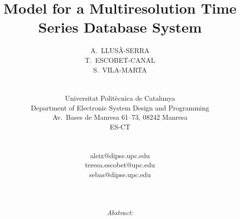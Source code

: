 \documentclass[twocolumn,11pt,a4paper]{article}
\begin{document}
\global\def\refname{{\normalsize \it References:}}
%
\baselineskip 12.5pt
%
%
%
\title{\LARGE \bf Model for a Multiresolution Time Series
  Database System}

\date{}

\author{\hspace*{-10pt}
\begin{minipage}[t]{2.3in} \normalsize \baselineskip 12.5pt
\centerline{\scshape A.~LLUSÀ-SERRA}
\end{minipage} \kern 0in
\begin{minipage}[t]{2.3in} \normalsize \baselineskip 12.5pt
\centerline{\scshape T.~ESCOBET-CANAL}
\end{minipage} \kern 0in
\begin{minipage}[t]{2.3in} \normalsize \baselineskip 12.5pt
\centerline{\scshape S.~VILA-MARTA}
\end{minipage} \\ \hspace*{-10pt}
%
\begin{minipage}[t]{2.7in} \normalsize \baselineskip 12.5pt
\centerline{Universitat Politècnica de Catalunya}
\centerline{Department of Electronic System Design and Programming}
\centerline{Av.~Bases de Manresa 61--73, 08242 Manresa}
\centerline{\scshape ES-CT}
\end{minipage} \\ \hspace*{-5pt}
%
\begin{minipage}[t]{2.3in} \normalsize \baselineskip 12.5pt
\centerline{aleix@dipse.upc.edu}
\end{minipage} \kern 0in
\begin{minipage}[t]{2.3in} \normalsize \baselineskip 12.5pt
\centerline{teresa.escobet@upc.edu}
\end{minipage} \kern 0in
\begin{minipage}[t]{2.3in} \normalsize \baselineskip 12.5pt
\centerline{sebas@dipse.upc.edu}
\end{minipage} 
%
\\ \\ \hspace*{-10pt}
\begin{minipage}[b]{6.9in} \normalsize
\baselineskip 12.5pt {\it Abstract:}

\end{minipage}}
\end{document}
